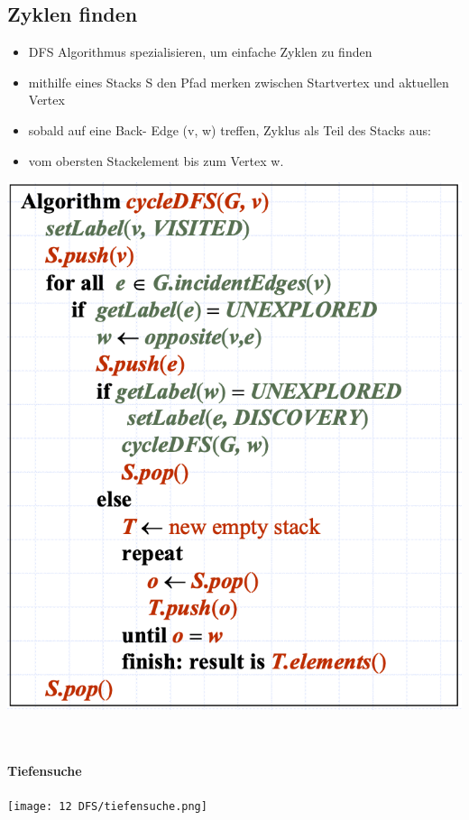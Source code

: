 \subsection{Zyklen finden}
\begin{itemize}
    \item DFS Algorithmus spezialisieren, um einfache Zyklen zu finden
    \item mithilfe eines Stacks S den Pfad merken zwischen Startvertex und aktuellen Vertex
    \item sobald auf eine Back- Edge (v, w) treffen, Zyklus als Teil des Stacks aus:
    \item vom obersten Stackelement bis zum Vertex w.
\end{itemize}
\vspace{-8pt}
\begin{center}
    \includegraphics[scale=.3]{graphic/12 DFS/Zyklen finden.png}
\end{center}
\vspace{-8pt}

\vfill
$ $
\columnbreak
\paragraph{Tiefensuche}
\begin{center}
    \texttt{[image: 12 DFS/tiefensuche.png]}
\end{center}


